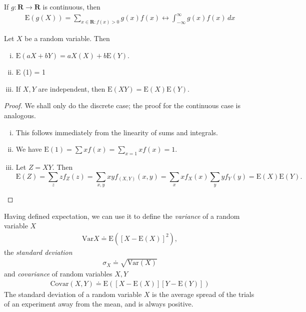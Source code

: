 \begin{lemma}
	If $g: \mathbf{R} \to \mathbf{R}$ is continuous, then
	\begin{align*}
		\mathrm{E}(g(X)) = \sum_{x \in \mathbf{R}: f(x) > 0} g(x) f(x) \longleftrightarrow
		\int_{-\infty}^{\infty} g(x) f(x) \, dx
	\end{align*}
\end{lemma}
\begin{theorem}
	Let $X$ be a random variable. Then
	\begin{enumerate}[(i)]
		\item $\mathrm{E}(a X + b Y) = a X(X) + b \mathrm{E}(Y)$.
		\item E (1) = 1
		\item If $X,Y$ are independent, then $\mathrm{E}(XY) = \mathrm{E}(X)\mathrm{E}(Y)$.
	\end{enumerate}
\end{theorem}
\begin{proof}
	We shall only do the discrete case; the proof for the continuous case is
	analogous.
	\begin{enumerate}[(i)]
		\item This follows immediately from the linearity of sums and integrals.
		\item
			We have $\mathrm{E}(1) = \sum x f(x) = \sum_{x = 1} x f(x) = 1$.
		\item
			Let $Z = XY$. Then
			\[\mathrm{E}(Z) = \sum_{z} z f_Z(z) = \sum_{x,y} x y f_{(X,Y)}(x,y) = \sum_x 
				x f_X(x)
			\sum_y y f_Y(y) = \mathrm{E}(X) \mathrm{E}(Y).\]
	\end{enumerate}
\end{proof}
Having defined expectation, we can use it to define the
\emph{variance} of a random variable $X$
\begin{align*}
	\mathrm{Var}X \doteq \mathrm{E}({[X - \mathrm{E}(X)]}^2),
\end{align*}
the \emph{standard deviation}
\begin{align*}
	\sigma_X \doteq \sqrt{\mathrm{Var}(X)}
\end{align*}
and \emph{covariance} of random variables $X, Y$
\begin{align*}
	\mathrm{Covar}(X,Y) \doteq \mathrm{E}([X - \mathrm{E}(X)][Y - \mathrm{E}(Y)])
\end{align*}
The standard deviation of a random variable $X$ is the average spread of the
trials of an experiment away from the mean, and is always positive. 

